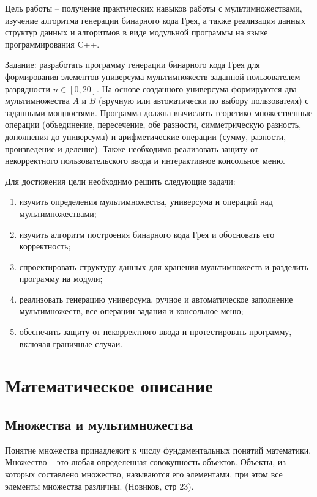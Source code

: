 \documentclass[14pt,a4paper]{extreport}
\begin{document}
Цель работы -- получение практических навыков работы с мультимножествами, изучение алгоритма генерации бинарного кода Грея, а также реализация данных структур данных и алгоритмов в виде модульной программы на языке программирования C++.

Задание: разработать программу генерации бинарного кода Грея для формирования элементов универсума мультимножеств заданной пользователем разрядности $n \in [0, 20]$. На основе созданного универсума формируются два мультимножества $A$ и $B$ (вручную или автоматически по выбору пользователя) с заданными мощностями. Программа должна вычислять теоретико-множественные операции (объединение, пересечение, обе разности, симметрическую разность, дополнения до универсума) и арифметические операции (сумму, разности, произведение и деление). Также необходимо реализовать защиту от некорректного пользовательского ввода и интерактивное консольное меню.

Для достижения цели необходимо решить следующие задачи:
\begin{enumerate}
\item изучить определения мультимножества, универсума и операций над мультимножествами;
\item изучить алгоритм построения бинарного кода Грея и обосновать его корректность;
\item спроектировать структуру данных для хранения мультимножеств и разделить программу на модули;
\item реализовать генерацию универсума, ручное и автоматическое заполнение мультимножеств, все операции задания и консольное меню;
\item обеспечить защиту от некорректного ввода и протестировать программу, включая граничные случаи.
\end{enumerate}

{\centering\section{Математическое описание}}

\subsection{Множества и мультимножества}

Понятие множества принадлежит к числу фундаментальных понятий математики. 
Множество -- это любая определенная совокупность объектов. 
Объекты, из которых составлено множество, называются его элементами, при этом все элементы множества различны. (Новиков, стр 23).
\end{document}
